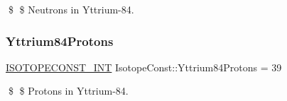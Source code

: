 \$ \$ Neutrons in Yttrium-\/84. \mbox{\label{group___isotope_const-_yttrium-_y84_ga60a4008d903d6eed6cd364cb2a76a45f}} 
\subsubsection{\texorpdfstring{Yttrium84\+Protons}{Yttrium84Protons}}
{\footnotesize\ttfamily \mbox{\hyperlink{group___isotope_const-_macros_ga5f18360b3e99483a35c32d789e62621c}{I\+S\+O\+T\+O\+P\+E\+C\+O\+N\+S\+T\+\_\+\+I\+NT}} Isotope\+Const\+::\+Yttrium84\+Protons = 39}

\$ \$ Protons in Yttrium-\/84. 